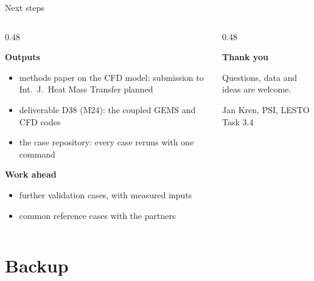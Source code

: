 \documentclass[aspectratio=169,10pt]{beamer}
\newcommand{\subhead}[1]{{\normalsize\bfseries\color{PSIblack}#1\par}\vspace{0.15em}}
\begin{document}
\begin{frame}[t]{Next steps}
  \begin{columns}[T,onlytextwidth]
    \begin{column}{0.48\textwidth}
      \subhead{Outputs}
      \begin{itemize}
        \item methods paper on the CFD model: submission to Int.\ J.\ Heat Mass Transfer planned
        \item deliverable D38 (M24): the coupled GEMS and CFD codes
        \item the case repository: every case reruns with one command
      \end{itemize}
      \subhead{Work ahead}
      \begin{itemize}
        \item further validation cases, with measured inputs
        \item common reference cases with the partners
      \end{itemize}
    \end{column}
    \begin{column}{0.48\textwidth}
      \vspace{2.2em}
      \centering
      {\Large\bfseries Thank you\par}
      \vspace{0.6em}
      {\normalsize Questions, data and ideas are welcome.\par}
      \vspace{0.8em}
      {\small\color{PSIgray}Jan Kren, PSI, LESTO Task 3.4\par}
    \end{column}
  \end{columns}
\end{frame}

\appendix
{}
\setcounter{section}{-1}%
\section{Backup}
\end{document}
